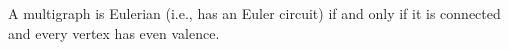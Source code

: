 A multigraph is Eulerian (i.e., has an Euler circuit) if and only if it is connected and every vertex has even valence.
